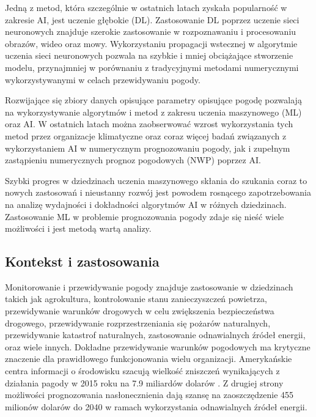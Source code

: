 Jedną z metod, która szczególnie w ostatnich latach zyskała popularność w zakresie
AI, jest uczenie głębokie (DL). Zastosowanie DL poprzez uczenie sieci neuronowych
znajduje szerokie zastosowanie w rozpoznawaniu i procesowaniu obrazów, wideo oraz
mowy. Wykorzystaniu propagacji wstecznej w algorytmie uczenia sieci neuronowych
pozwala na szybkie i mniej obciążające stworzenie modelu, przynajmniej w porównaniu
z tradycyjnymi metodami numerycznymi wykorzystywanymi w celach przewidywaniu pogody.

Rozwijające się zbiory danych opisujące parametry opisujące pogodę 
pozwalają na wykorzystywanie algorytmów i metod z zakresu uczenia maszynowego (ML)
oraz AI. W ostatnich latach można zaobserwować wzrost wykorzystania tych metod
przez organizacje klimatyczne oraz coraz więcej badań związanych z wykorzystaniem
AI w numerycznym prognozowaniu pogody, jak i zupełnym zastąpieniu numerycznych
prognoz pogodowych (NWP) poprzez AI.

Szybki progres w dziedzinach uczenia maszynowego skłania do szukania coraz to nowych
zastosowań i nieustanny rozwój jest powodem rosnącego zapotrzebowania na analizę
wydajności i dokładności algorytmów AI w różnych dziedzinach. Zastosowanie ML w
problemie prognozowania pogody zdaje się nieść wiele możliwości i jest metodą
wartą analizy. 

\subsection{Kontekst i zastosowania}

Monitorowanie i przewidywanie pogody znajduje zastosowanie w dziedzinach takich
jak agrokultura, kontrolowanie stanu zanieczyszczeń powietrza, 
przewidywanie warunków drogowych w celu zwiększenia bezpieczeństwa drogowego,
przewidywanie rozprzestrzeniania się pożarów naturalnych,
przewidywanie katastrof naturalnych, zastosowanie odnawialnych źródeł energii,
oraz wiele innych. Dokładne przewidywanie warunków pogodowych ma krytyczne znaczenie
dla prawidłowego funkcjonowania wielu organizacji. Amerykańskie centra
informacji o środowisku szacują wielkość zniszczeń wynikających z działania
pagody w 2015 roku na 7.9 miliardów dolarów \cite{using-artificial-intelligence-to-improve}.
Z drugiej strony możliwości prognozowania nasłonecznienia dają szansę na zaoszczędzenie
455 milionów dolarów do 2040 w ramach wykorzystania odnawialnych źródeł energii.

